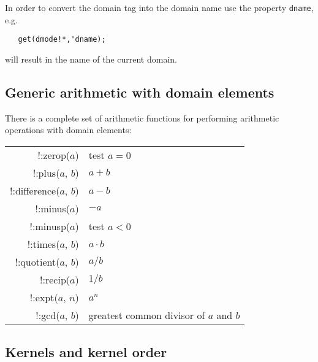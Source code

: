 \documentclass[11pt]{article}
\makeatletter
\newcommand{\ttindex}[1]{\index{#1@{\texttt{#1}}}}
\makeatother
\begin{document}
In order to convert the domain tag into the domain name
use the property \texttt{dname}\ttindex{dname}, e.g.
\begin{verbatim}
   get(dmode!*,'dname);
\end{verbatim}
will result in the name of the current domain.

\subsection{Generic arithmetic with domain elements}

There is a complete set of arithmetic functions for performing
arithmetic operations with domain elements:

\begin{center}
\begin{tabular}{|r|l|} \hline
    !:zerop($a$)           & test $a=0$ \\
    !:plus($a$, $b$)       & $a+b$ \\
    !:difference($a$, $b$) & $a-b$ \\
    !:minus($a$)           & $-a$  \\
    !:minusp($a$)          & test $a<0$ \\
    !:times($a$, $b$)      & $a\cdot b$ \\
    !:quotient($a$, $b$)   & $a/b$ \\
    !:recip($a$)           & $1/b$ \\
    !:expt($a$, $n$)       & $a^n$ \\
    !:gcd($a$, $b$)        & greatest common divisor of $a$ and $b$ \\
\hline
\end{tabular}
\end{center}

\subsection{Kernels and kernel order}
\end{document}
